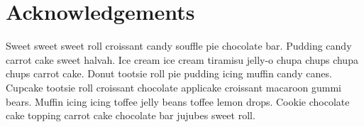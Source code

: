 

\chapter*{Acknowledgements}

Sweet sweet sweet roll croissant candy souffle pie chocolate bar.
Pudding candy carrot cake sweet halvah. 
Ice cream ice cream tiramisu jelly-o chupa chups chupa chups carrot cake. 
Donut tootsie roll pie pudding icing muffin candy canes. 
Cupcake tootsie roll croissant chocolate applicake croissant macaroon gummi bears. 
Muffin icing icing toffee jelly beans toffee lemon drops. 
Cookie chocolate cake topping carrot cake chocolate bar jujubes sweet roll.
